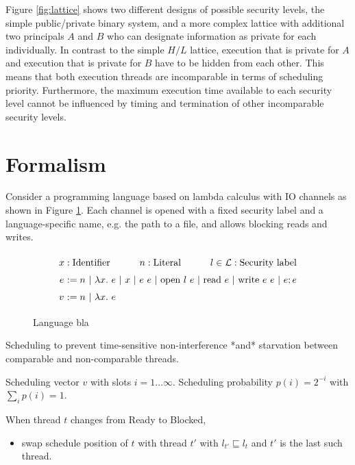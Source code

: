 \documentclass[10pt,preprint]{sigplanconf}
\begin{document}
Figure \ref{fig:lattice} shows two different designs of possible security levels, the simple public/private binary system, and a more complex lattice with additional two principals $A$ and $B$ who can designate information as private for each individually.  In contrast to the simple $H/L$ lattice, execution that is private for $A$ and execution that is private for $B$ have to be hidden from each other.  This means that both execution threads are incomparable in terms of scheduling priority.  Furthermore, the maximum execution time available to each security level cannot be influenced by timing and termination of other incomparable security levels.

\section{Formalism}

Consider a programming language based on lambda calculus with IO channels as shown in Figure \ref{fig:lang}.  Each channel is opened with a fixed security label and a language-specific name, e.g. the path to a file, and allows blocking reads and writes.

\begin{figure}
\[ \arraycolsep=1.6pt\def\arraystretch{1.5}
\begin{array}{rl}
  \multicolumn{2}{l}{x : \text{Identifier} \hfill n : \text{Literal} \hfill l \in \mathcal{L} : \text{Security label}}  \\
  e & := n ~|~ \lambda x.~e ~|~ x ~|~ e ~ e ~|~ \text{open}~l~e ~|~
          \text{read}~e ~|~\text{write}~e~e ~|~e ; e \\
  v & := n ~|~ \lambda x.~e \\
\end{array} \]
\caption{Language bla}
\label{fig:lang}
\end{figure}


Scheduling to prevent time-sensitive non-interference *and* starvation between comparable and non-comparable threads.

Scheduling vector $v$ with slots $i=1 \ldots \infty$.  Scheduling probability $p(i) = 2^{-i}$ with $\sum_i p(i) = 1$.

When thread $t$ changes from Ready to Blocked,

\begin{itemize}
  \item swap schedule position of $t$ with thread $t'$ with $l_{t'} \sqsubseteq l_t$ and $t'$ is the last such thread.
\end{itemize}
\end{document}
